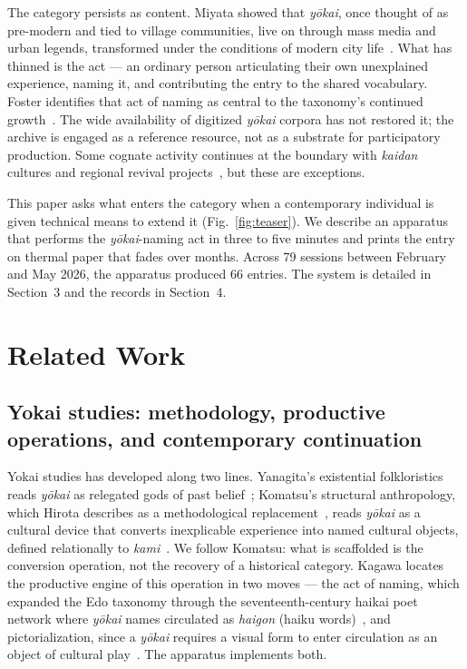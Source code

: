 \documentclass[manuscript,review,anonymous,nonacm]{acmart}
\begin{document}
The category persists as content. Miyata showed that \textit{y\=okai}, once thought of as pre-modern and tied to village communities, live on through mass media and urban legends, transformed under the conditions of modern city life~\cite{miyata1985}. What has thinned is the act — an ordinary person articulating their own unexplained experience, naming it, and contributing the entry to the shared vocabulary. Foster identifies that act of naming as central to the taxonomy's continued growth~\cite{foster2015}. The wide availability of digitized \textit{y\=okai} corpora has not restored it; the archive is engaged as a reference resource, not as a substrate for participatory production. Some cognate activity continues at the boundary with \textit{kaidan} cultures and regional revival projects~\cite{ichikawa2014}, but these are exceptions.

This paper asks what enters the category when a contemporary individual is given technical means to extend it (Fig.~\ref{fig:teaser}). We describe an apparatus that performs the \textit{y\=okai}-naming act in three to five minutes and prints the entry on thermal paper that fades over months. Across 79 sessions between February and May 2026, the apparatus produced 66 entries. The system is detailed in Section~3 and the records in Section~4.

\section{Related Work}

\subsection{Yokai studies: methodology, productive operations, and contemporary continuation}

Yokai studies has developed along two lines. Yanagita's existential folkloristics reads \textit{y\=okai} as relegated gods of past belief~\cite{yanagita1956}; Komatsu's structural anthropology, which Hirota describes as a methodological replacement~\cite{hirota2017}, reads \textit{y\=okai} as a cultural device that converts inexplicable experience into named cultural objects, defined relationally to \textit{kami}~\cite{komatsu2017}. We follow Komatsu: what is scaffolded is the conversion operation, not the recovery of a historical category. Kagawa locates the productive engine of this operation in two moves — the act of naming, which expanded the Edo taxonomy through the seventeenth-century haikai poet network where \textit{y\=okai} names circulated as \textit{haigon} (haiku words)~\cite{kagawa2020,kagawa2022}, and pictorialization, since a \textit{y\=okai} requires a visual form to enter circulation as an object of cultural play~\cite{kagawa2022}. The apparatus implements both.
\end{document}
